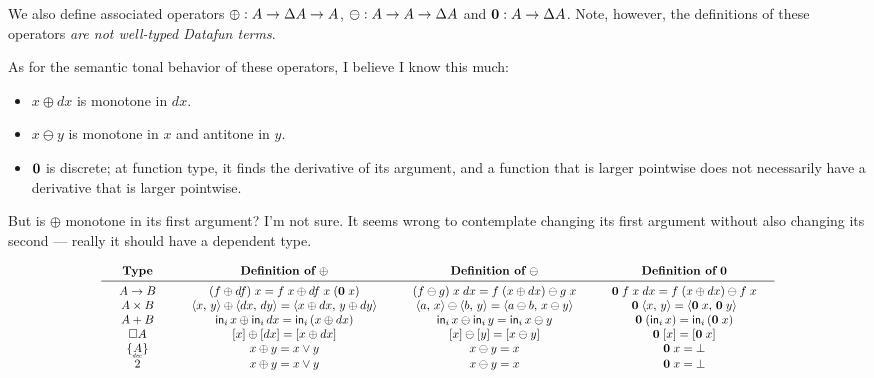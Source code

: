 \documentclass{article}
\begin{document}
We also define associated operators $\oplus : A \to \Delta A \to A$, $\ominus : A
\to A \to \Delta A$ and $\mathbf{0} : A \to \Delta A$. Note, however, the
definitions of these operators \emph{are not well-typed Datafun terms}. 

As for the semantic tonal behavior of these operators, I believe I know this
much:
\begin{itemize}
\item $x \oplus dx$ is monotone in $dx$.
\item $x \ominus y$ is monotone in $x$ and antitone in $y$.
\item $\mathbf{0}$ is discrete; at function type, it finds the derivative of its
  argument, and a function that is larger pointwise does not necessarily have a
  derivative that is larger pointwise.
\end{itemize}

But is $\oplus$ monotone in its first argument? I'm not sure. It seems wrong to
contemplate changing its first argument without also changing its second ---
really it should have a dependent type.

\begin{center}
\[
\scalebox{0.85}{\(
\arraycolsep=1.5em
\begin{array}{cccc}
  \textbf{Type}
  & {\textbf{Definition of}~\oplus}
  & {\textbf{Definition of}~\ominus}
  & {\textbf{Definition of}~\zero}
  \\ \midrule
  A \to B
  & (f \oplus df)\; x = f\; x \oplus df\; x\; (\zero\; x)
  & (f \ominus g)\; x \;dx = f\; (x \oplus dx) \ominus g \; x
  & \zero\; f\; x\; dx = f\; (x \oplus dx) \ominus f\; x
  \\
  A \x B
  & \pair{x}{y} \oplus \pair{dx}{dy} = \pair{x \oplus dx}{y \oplus dy}
  & \pair{a}{x} \ominus \pair{b}{y} = \pair{a \ominus b}{x \ominus y}
  & \zero \; \pair{x}{y} = \pair{\zero\; x}{\zero\; y}
  \\
  A + B
  & \inj{i}{x} \oplus \inj{i}{dx} = \inj{i}{(x \oplus dx)}
  & \inj{i}{x} \ominus \inj{i}{y} = \inj{i}{x \ominus y}
  & \zero\; (\inj{i}{x}) = \inj{i}{(\zero\;x)}
  \\
  \Disc{A}
  & \disc{x} \oplus \disc{dx} = \disc{x \oplus dx}
  & \disc{x} \ominus \disc{y} = \disc{x \ominus y}
  & \zero\; \disc{x} = \disc{\zero\; x}
  \\
  \Seteq{A}
  & x \oplus y = x \vee y
  & x \ominus y = x
  & \zero\; x = \unit
  \\
  \tbool
  & x \oplus y = x \vee y
  & x \ominus y = x
  & \zero\; x = \unit
\end{array}
\)}
\]
\end{center}
\end{document}
